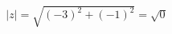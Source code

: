 \documentclass[preview]{standalone}
\begin{document}
\begin{align*}
|z| = \sqrt{   (-3)^2   +   (-1)^2   } = \sqrt{0}
\end{align*}
\end{document}
